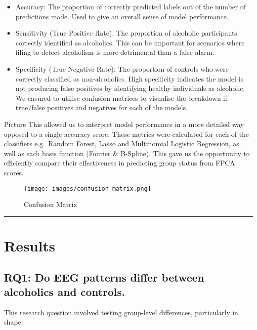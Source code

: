 \documentclass{article}
\begin{document}
\begin{itemize}
\item
  Accuracy: The proportion of correctly predicted labels out of the
  number of predictions made. Used to give an overall sense of model
  performance.
\item
  Sensitivity (True Positive Rate): The proportion of alcoholic
  participants correctly identified as alcoholics. This can be important
  for scenarios where filing to detect alcoholism is more detrimental
  than a false alarm.
\item
  Specificity (True Negative Rate): The proportion of controls who were
  correctly classified as non-alcoholics. High specificity indicates the
  model is not producing false positives by identifying healthy
  individuals as alcoholic. We ensured to utilise confusion matrices to
  visualise the breakdown if true/false positives and negatives for each
  of the models.
\end{itemize}

Picture This allowed us to interpret model performance in a more
detailed way opposed to a single accuracy score. These metrics were
calculated for each of the classifiers e.g.~Random Forest, Lasso and
Multinomial Logistic Regression, as well as each basis function (Fourier
\& B-Spline). This gave us the opportunity to efficiently compare their
effectiveness in predicting group status from FPCA scores.

\begin{figure}[H]
\centering
\texttt{[image: images/confusion\_matrix.png]}
\caption{Confusion Matrix}
\end{figure}

\begin{center}\rule{0.5\linewidth}{0.5pt}\end{center}

\section{Results}\label{results}

\subsection{RQ1: Do EEG patterns differ between alcoholics and
controls.}\label{rq1-do-eeg-patterns-differ-between-alcoholics-and-controls.}

This research question involved testing group-level differences,
particularly in shape.
\end{document}
